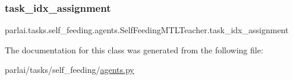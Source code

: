 \subsubsection{\texorpdfstring{task\+\_\+idx\+\_\+assignment}{task\_idx\_assignment}}
{\footnotesize\ttfamily parlai.\+tasks.\+self\+\_\+feeding.\+agents.\+Self\+Feeding\+M\+T\+L\+Teacher.\+task\+\_\+idx\+\_\+assignment}



The documentation for this class was generated from the following file\+:\begin{DoxyCompactItemize}
\item 
parlai/tasks/self\+\_\+feeding/\hyperlink{parlai_2tasks_2self__feeding_2agents_8py}{agents.\+py}\end{DoxyCompactItemize}
